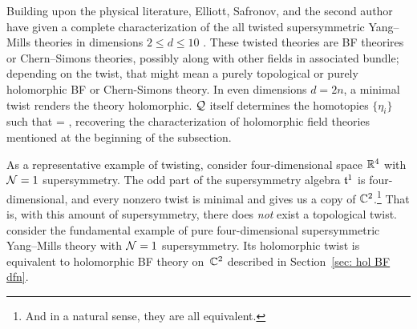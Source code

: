 \documentclass[11pt]{amsart}
\def\del{\partial}
\begin{document}
Building upon the physical literature, Elliott, Safronov, and the second author have given a complete characterization of the all twisted supersymmetric Yang--Mills theories in dimensions $2 \leq d \leq 10$ \autocite{ESW}. 
These twisted theories are BF theorires or Chern--Simons theories, possibly along with other fields in associated bundle; 
depending on the twist, that might mean a purely topological or purely holomorphic BF or Chern-Simons theory.
In even dimensions $d = 2n$, a minimal twist renders the theory holomorphic.
$\mathcal Q$ itself determines the homotopies $\{\eta_i\}$ such that 
\beqn
[\cQ,\eta_i] = \frac{\del}{\del \zbar_i} ,
\eeqn 
recovering the characterization of holomorphic field theories mentioned at the beginning of the subsection. 

As a representative example of twisting, 
consider four-dimensional space $\mathbb R^4$ with $\mathcal N=1$ supersymmetry.
The odd part of the supersymmetry algebra $\mathfrak t^1$ is four-dimensional, 
and every nonzero twist is minimal and gives us a copy of $\mathbb C^2$.\footnote{And in a natural sense, they are all equivalent.}
That is, with this amount of supersymmetry, there does {\it not} exist a topological twist.
consider the fundamental example of pure four-dimensional supersymmetric Yang--Mills theory with $\mathcal N=1$ supersymmetry. 
Its holomorphic twist is equivalent to holomorphic BF theory on~$\mathbb C^2$ described in Section~\ref{sec: hol BF dfn}.
\end{document}
